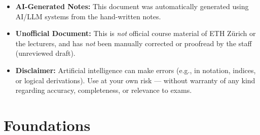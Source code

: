 \documentclass{report}
\theoremstyle{purplethm}
\theoremstyle{purplethm}
\theoremstyle{defthm}
\theoremstyle{examplethm}
\theoremstyle{questionthm}
\theoremstyle{remarkthm}
\theoremstyle{asidethm}
\theoremstyle{importantremarkthm}
\theoremstyle{remarkthm}
\theoremstyle{ainotethm}
\theoremstyle{purplethm}
\begin{document}
\begin{titlepage}
\begin{minipage}{\textwidth}
\begin{tcolorbox}[
        arc=6pt,
        boxrule=0.7pt,
        colback=MidnightBlue!3!white,
        colframe=MidnightBlue!30!white,
        left=10pt, right=10pt, top=8pt, bottom=8pt
    ]
    \vspace{0.25cm}
    \sffamily\small\color{black!75}
    \begin{itemize}[leftmargin=1.5em, itemsep=3pt, topsep=0pt, parsep=0pt]
        \item[\textcolor{MidnightBlue!80!black}{\small\faRobot}] \textbf{AI-Generated Notes:} This document was automatically generated using AI/LLM systems from the hand-written notes.
        \item[\textcolor{MidnightBlue!80!black}{\small\faUserShield}] \textbf{Unofficial Document:} This is \emph{not} official course material of ETH Zürich or the lecturers, and has \emph{not} been manually corrected or proofread by the staff (unreviewed draft).
        \item[\textcolor{MidnightBlue!80!black}{\small\faExclamationTriangle}] \textbf{Disclaimer:} Artificial intelligence can make errors (e.g., in notation, indices, or logical derivations). Use at your own risk --- without warranty of any kind regarding accuracy, completeness, or relevance to exams.
    \end{itemize}
    \end{tcolorbox}
\end{minipage}
\vspace*{0.5cm}
\end{titlepage}
\tableofcontents %
\hypersetup{linkcolor=LinkColor} %
\cleardoublepage


\part{Foundations}
\end{document}
